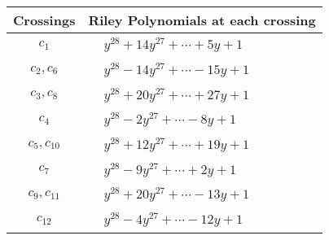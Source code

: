 \documentclass[1p]{elsarticle_modified}
\theoremstyle{definition}
\begin{document}
\begin{tabular}{m{50pt}|m{274pt}}
Crossings & \hspace{64pt}Riley Polynomials at each crossing \\
\hline $$\begin{aligned}c_{1}\end{aligned}$$&$\begin{aligned}
&y^{28}+14 y^{27}+\cdots+5 y+1
\end{aligned}$\\
\hline $$\begin{aligned}c_{2},c_{6}\end{aligned}$$&$\begin{aligned}
&y^{28}-14 y^{27}+\cdots-15 y+1
\end{aligned}$\\
\hline $$\begin{aligned}c_{3},c_{8}\end{aligned}$$&$\begin{aligned}
&y^{28}+20 y^{27}+\cdots+27 y+1
\end{aligned}$\\
\hline $$\begin{aligned}c_{4}\end{aligned}$$&$\begin{aligned}
&y^{28}-2 y^{27}+\cdots-8 y+1
\end{aligned}$\\
\hline $$\begin{aligned}c_{5},c_{10}\end{aligned}$$&$\begin{aligned}
&y^{28}+12 y^{27}+\cdots+19 y+1
\end{aligned}$\\
\hline $$\begin{aligned}c_{7}\end{aligned}$$&$\begin{aligned}
&y^{28}-9 y^{27}+\cdots+2 y+1
\end{aligned}$\\
\hline $$\begin{aligned}c_{9},c_{11}\end{aligned}$$&$\begin{aligned}
&y^{28}+20 y^{27}+\cdots-13 y+1
\end{aligned}$\\
\hline $$\begin{aligned}c_{12}\end{aligned}$$&$\begin{aligned}
&y^{28}-4 y^{27}+\cdots-12 y+1
\end{aligned}$\\
\hline
\end{tabular}\\~\\
\end{document}
